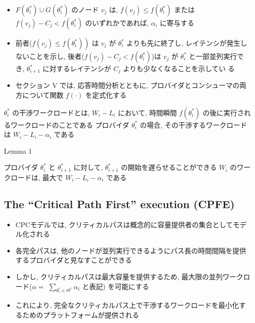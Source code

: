 \begin{frame}{}
    \begin{itemize}
        \item $F\left(\theta_{i}^{*}\right) \cup G\left(\theta_{i}^{*}\right)$ のノード $v_{j}$ は, $f\left(v_{j}\right) \leq f\left(\theta_{i}^{*}\right)$ または $f\left(v_{j}\right)-C_{j}<f\left(\theta_{i}^{*}\right)$ のいずれかであれば, $\alpha_{i}$ に寄与する
        \item 前者($\left.f\left(v_{j}\right) \leq f\left(\theta_{i}^{*}\right)\right)$ は $v_{j}$ が $\theta_{i}^{*}$ よりも先に終了し, レイテンシが発生し ないことを示し, 後者($f\left(v_{j}\right)-C_{j}<f\left(\theta_{i}^{*}\right)$)は $v_{j}$ が $\theta_{i}^{*}$ と一部並列実行でき,  $\theta_{i+1}^{*}$ に対するレイテンシが $C_{j}$ よりも少なくなることを示してい る
        \item セクション V では, 応答時間分析とともに, プロバイダとコンシューマの両方について関数 $f(\cdot)$ を定式化する
    \end{itemize}
\end{frame}

\begin{frame}{}
    \begin{definition}
        $\theta_{i}^{*}$ の干渉ワークロードとは, $W_{i}-L_{i}$ において, 時間瞬間 $f\left(\theta_{i}^{*}\right)$ の後に実行されるワークロードのことである
        プロバイダ $\theta_{i}^{*}$ の場合, その干渉するワークロードは $W_{i}-L_{i}-\alpha_{i}$ である
    \end{definition}
\end{frame}

\begin{frame}[label=lemma1]{Lemma 1}
    \begin{lemma}[]
        プロバイダ $\theta_{i}^{*}$ と $\theta_{i+1}^{*}$ に対して, $\theta_{i+1}^{*}$ の開始を遅らせることができる $W_{i}$ のワークロードは, 最大で $W_{i}-L_{i}-\alpha_{i}$ である
    \end{lemma}
\end{frame}


\subsection{The “Critical Path First” execution (CPFE)}
\label{ssec: CPEF}

\begin{frame}{}
    \begin{itemize}
        \item CPCモデルでは, クリティカルパスは概念的に容量提供者の集合としてモデル化される
        \item 各完全パスは, 他のノードが並列実行できるようにパス長の時間間隔を提供するプロバイダと見なすことができる
        \item しかし, クリティカルパスは最大容量を提供するため, 最大限の並列ワークロード($\alpha=$  $\sum_{\theta_{*}^{*} \in \Theta^{*}} \alpha_{i}$ と表記) を可能にする
        \item これにより, 完全なクリティカルパス上で干渉するワークロードを最小化するためのプラットフォームが提供される
    \end{itemize}
\end{frame}

